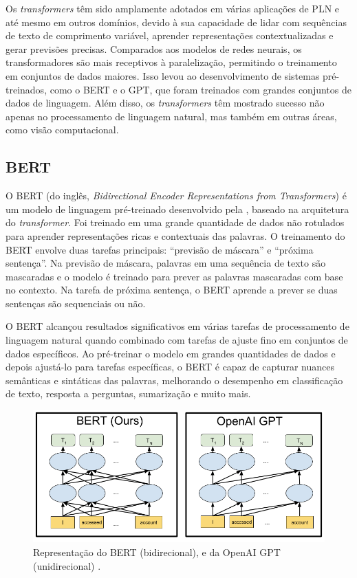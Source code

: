 Os \textit{transformers} têm sido amplamente adotados em várias aplicações de PLN e até mesmo em outros domínios, devido à sua capacidade de lidar com sequências de texto de comprimento variável, aprender representações contextualizadas e gerar previsões precisas. Comparados aos modelos de redes neurais, os transformadores são mais receptivos à paralelização, permitindo o treinamento em conjuntos de dados maiores. Isso levou ao desenvolvimento de sistemas pré-treinados, como o BERT e o GPT, que foram treinados com grandes conjuntos de dados de linguagem. Além disso, os \textit{transformers} têm mostrado sucesso não apenas no processamento de linguagem natural, mas também em outras áreas, como visão computacional.

\subsection{BERT}

O BERT (do inglês, \textit{Bidirectional Encoder Representations from Transformers}) é um modelo de linguagem pré-treinado desenvolvido pela , baseado na arquitetura do \textit{transformer}. Foi treinado em uma grande quantidade de dados não rotulados para aprender representações ricas e contextuais das palavras. O treinamento do BERT envolve duas tarefas principais: ``previsão de máscara'' e ``próxima sentença''. Na previsão de máscara, palavras em uma sequência de texto são mascaradas e o modelo é treinado para prever as palavras mascaradas com base no contexto. Na tarefa de próxima sentença, o BERT aprende a prever se duas sentenças são sequenciais ou não.

O BERT alcançou resultados significativos em várias tarefas de processamento de linguagem natural quando combinado com tarefas de ajuste fino em conjuntos de dados específicos. Ao pré-treinar o modelo em grandes quantidades de dados e depois ajustá-lo para tarefas específicas, o BERT é capaz de capturar nuances semânticas e sintáticas das palavras, melhorando o desempenho em classificação de texto, resposta a perguntas, sumarização e muito mais.

\begin{figure}[!htbp]
	\centering
	\includegraphics[scale=0.4]{imagens/BERT.png}
    \caption {Representação do BERT (bidirecional), e da OpenAI GPT (unidirecional) \cite{BERTImagem}.}
\end{figure}

